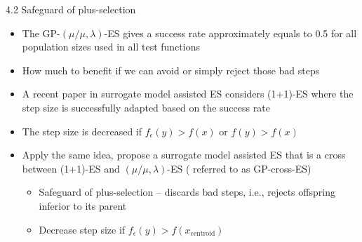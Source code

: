 \documentclass{beamer}
\begin{document}
\begin{frame}{4.2 Safeguard of plus-selection}
\begin{itemize}
    \item The GP-$(\mu/\mu,\lambda)$-ES gives a success rate approximately equals to 0.5 for all population sizes used in all test functions
    \item How much to benefit if we can avoid or simply reject those bad steps
    \item A recent paper in surrogate model assisted ES considers (1+1)-ES where the step size is successfully adapted based on the success rate 
        \item The step size is decreased if $f_\epsilon(y)>f(x)$ or $f(y)>f(x)$
    \begin{itemize}
    \end{itemize}
    \item Apply the same idea, propose a surrogate model assisted ES that is a cross between (1+1)-ES and $(\mu/\mu,\lambda)$-ES ( referred to as GP-cross-ES)
        \begin{itemize}
            \item Safeguard of plus-selection -- discards bad steps, i.e., rejects offspring inferior to its parent
            \item Decrease step size if $f_\epsilon(y)>f(x_{\text{centroid}})$
        \end{itemize}
        
\end{itemize}
\end{frame}
\end{document}
